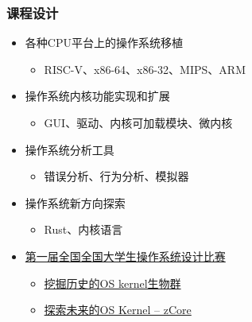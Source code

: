 \begin{frame}
\frametitle{课程设计}
	\begin{itemize}
	\item 各种CPU平台上的操作系统移植
		\begin{itemize}	
		\item RISC-V、x86-64、x86-32、MIPS、ARM
		\end{itemize}
	\item 操作系统内核功能实现和扩展
		\begin{itemize}	
		\item GUI、驱动、内核可加载模块、微内核
		\end{itemize} \pause
	\item 操作系统分析工具	
		\begin{itemize}	
		\item 错误分析、行为分析、模拟器
		\end{itemize}
	\item 操作系统新方向探索
		\begin{itemize}	
		\item Rust、内核语言
		\end{itemize} \pause
	\item \href{https://github.com/oscomp/os-competition-info}{第一届全国全国大学生操作系统设计比赛}
		\begin{itemize}	
		\item \href{https://github.com/oscomp/proj2-os-kernels-by-history}{挖掘历史的OS kernel生物群}
        \item \href{https://github.com/oscomp/proj9-zcore}{探索未来的OS Kernel -- zCore}
		\end{itemize}
	\end{itemize}
\end{frame}
    
